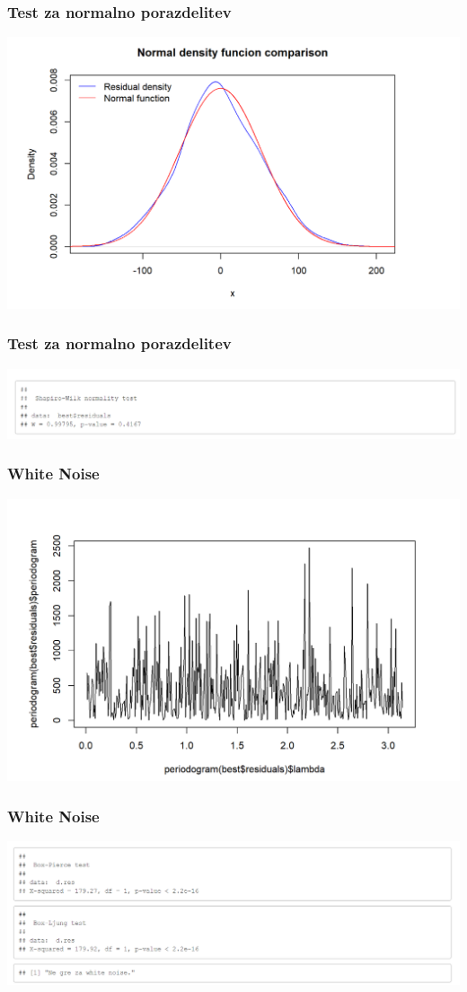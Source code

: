 \documentclass[10pt]{beamer}
\begin{document}
\begin{frame}
\frametitle{Test za normalno porazdelitev}
\includegraphics[width=1\textwidth]{normalnaA.png}

\end{frame}

\begin{frame}
\frametitle{Test za normalno porazdelitev}
\includegraphics[width=1\textwidth]{ShapiroA.png}

\end{frame}


\begin{frame}
\frametitle{White Noise}
\includegraphics[width=1\textwidth]{whiteA.png}
\end{frame}

\begin{frame}
\frametitle{White Noise}
\includegraphics[width=1\textwidth]{testwnA.png}
\end{frame}
\end{document}
